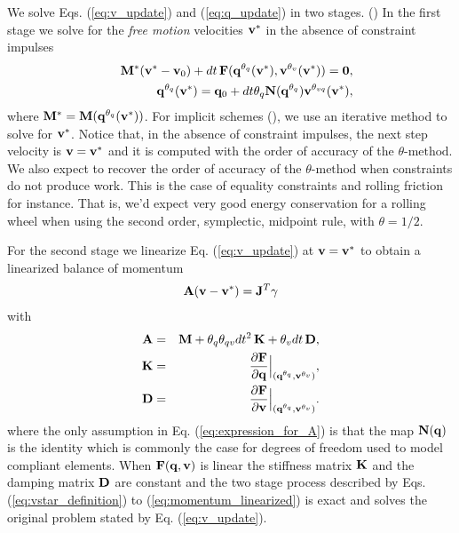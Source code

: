 We solve Eqs. (\ref{eq:v_update}) and (\ref{eq:q_update}) in two stages. () In the
first stage we solve for the \textit{free motion} velocities ${\mathbf{v}}^*$ in the
absence of constraint impulses 
\begin{eqnarray}
	&&\mf{M}^*(\mf{v}^*-\mf{v}_0) + dt\,\mf{F}(\mf{q}^{\theta_q}(\mf{v}^*), \mf{v}^{\theta_v}(\mf{v}^*)) = \mf{0},
	\label{eq:vstar_definition}\\
	&&\mf{q}^{\theta_q}(\mf{v}^*) = \mf{q}_0 + dt\theta_q\mf{N}(\mf{q}^{\theta_{q}})\mf{v}^{\theta_{vq}}(\mf{v}^*),
	\label{eq:qstar_definition}
\end{eqnarray}
where ${\mathbf{M}}^* = {\mathbf{M}}({\mathbf{q}}^{\theta_q}({\mathbf{v}}^*))$. For implicit schemes
(), we
use an iterative method to solve for ${\mathbf{v}}^*$. Notice that, in the
absence of constraint impulses, the next step velocity is ${\mathbf{v}}={\mathbf{v}}^*$ and
it is computed with the order of accuracy of the $\theta\text{-method}$. We also
expect to recover the order of accuracy of the $\theta\text{-method}$ when
constraints do not produce work.  This is the case of equality constraints and
rolling friction for instance. That is, we'd expect very good  energy
conservation for a rolling wheel when using the second order, symplectic,
midpoint rule, with $\theta=1/2$.

For the second stage we linearize Eq. (\ref{eq:v_update})
at ${\mathbf{v}} = {\mathbf{v}}^*$ to obtain a linearized balance of momentum
\begin{eqnarray}
	\mf{A}(\mf{v}-\mf{v}^*)= \mf{J}^T\mf{\gamma}
	\label{eq:momentum_linearized}
\end{eqnarray}
with
\begin{eqnarray}
	\mf{A}&=&\mf{M}+\theta_q\theta_{qv} dt^2\,\mf{K}+\theta_v dt\,\mf{D},
	\label{eq:expression_for_A}\\
	\mf{K}&=&\frac{\partial \mf{F}}{\partial \mf{q}}\Bigr|_{(\mf{q}^{\theta_q}, \mf{v}^{\theta_v})},\\
	\mf{D}&=&\frac{\partial \mf{F}}{\partial \mf{v}}\Bigr|_{(\mf{q}^{\theta_q},
	\mf{v}^{\theta_v})}.
	\label{eq:dissipation_matrix}
\end{eqnarray}
where the only assumption in Eq. (\ref{eq:expression_for_A}) is that the map
${\mathbf{N}}({\mathbf{q}})$ is the identity 
 which is commonly the case for degrees of
freedom used to model compliant elements. When ${\mathbf{F}}({\mathbf{q}}, {\mathbf{v}})$ is
linear the stiffness matrix ${\mathbf{K}}$ and the damping matrix ${\mathbf{D}}$ are
constant and the two stage process described by Eqs. (\ref{eq:vstar_definition})
to (\ref{eq:momentum_linearized}) is exact and solves the original problem
stated by Eq. (\ref{eq:v_update}).


